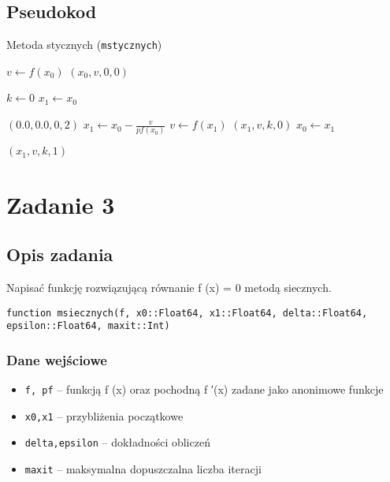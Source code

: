 \documentclass{article}
\begin{document}
\subsection*{Pseudokod}
\begin{algorithm}
\caption{Metoda stycznych (\texttt{mstycznych})}
\begin{algorithmic}[1]
    \State $v \gets f(x_0)$
        \State \Return $(x_0, v, 0, 0)$
    \EndIf

    \State $k \gets 0$
    \State $x_1 \gets x_0$

            \State \Return $(0.0, 0.0, 0, 2)$
        \EndIf
        \State $x_1 \gets x_0 - \frac{v}{pf(x_0)}$
        \State $v \gets f(x_1)$
            \State \Return $(x_1, v, k, 0)$
        \EndIf
        \State $x_0 \gets x_1$
    \EndFor

    \State \Return $(x_1, v, k, 1)$
\EndFunction
\end{algorithmic}
\end{algorithm}
\section*{Zadanie 3}
\subsection*{Opis zadania}
Napisać funkcję rozwiązującą równanie f (x) = 0 metodą siecznych.

\texttt{function msiecznych(f, x0::Float64, x1::Float64, delta::Float64, epsilon::Float64, maxit::Int)}
\subsubsection*{Dane wejściowe}
    \begin{itemize}
        \item \texttt{f, pf} – funkcją f (x) oraz pochodną f ′(x) zadane jako anonimowe funkcje
        \item \texttt{x0,x1} – przybliżenia początkowe
        \item \texttt{delta,epsilon} – dokładności obliczeń
        \item \texttt{maxit} – maksymalna dopuszczalna liczba iteracji
    \end{itemize}
\end{document}
